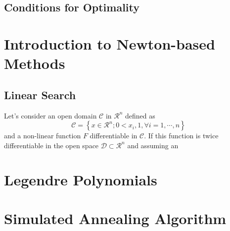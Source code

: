 \subsection{Conditions for Optimality}\label{Chapter:GlobalOpt:Section:Definitions}


\section{Introduction to Newton-based Methods}\label{Chapter:GlobalOpt:Section:NewtonMethods}

\subsection{Linear Search}\label{Chapter:GlobalOpt:Section:NewtonMethods:LinearSearch}

\begin{shaded}
    Let's consider an open domain $\mathcal{C}$ in $\mathcal{R}^{n}$ defined as
\begin{displaymath}
    \mathcal{C} = \left\{x\in\mathcal{R}^{n}; 0<x_{i},1, \forall i=1,\cdots,n\right\}
\end{displaymath}
and a non-linear function $F$ differentiable in $\mathcal{C}$. If this function is twice differentiable in the open space $\mathcal{D}\subset\mathcal{R}^{n}$ and assuming an 
\end{shaded}

\section{Legendre Polynomials}

\clearpage
\section{Simulated Annealing Algorithm}\label{Chapter:GlobalOpt:Section:SimulatedAnnealing}

